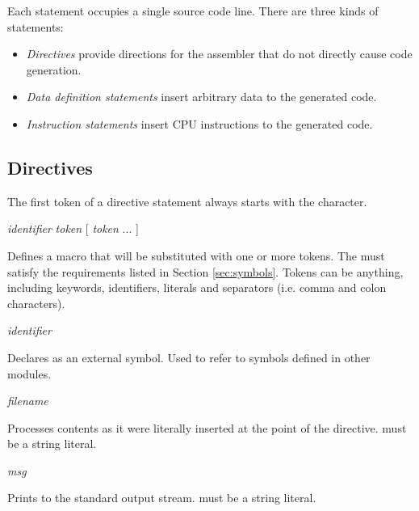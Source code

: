 \documentclass[a4paper,12pt,twoside,extrafontsizes]{memoir}
\begin{document}
Each statement occupies a single source code line. There are three kinds of statements:

\begin{itemize}
	\item \emph{Directives} provide directions for the assembler that do not directly cause code generation.
	\item \emph{Data definition statements} insert arbitrary data to the generated code.
	\item \emph{Instruction statements} insert \lxp{} CPU instructions to the generated code.
\end{itemize}

\subsection{Directives}

The first token of a directive statement always starts with the \code{\#} character.

\begin{codepar}
 \emph{identifier} \emph{token} [ \emph{token} ... ]
\end{codepar}

Defines a macro that will be substituted with one or more tokens. The  must satisfy the requirements listed in Section \ref{sec:symbols}. Tokens can be anything, including keywords, identifiers, literals and separators (i.e. comma and colon characters).

\begin{codepar}
 \emph{identifier}
\end{codepar}

Declares  as an external symbol. Used to refer to symbols defined in other modules.

\begin{codepar}
 \emph{filename}
\end{codepar}

Processes  contents as it were literally inserted at the point of the  directive.  must be a string literal.

\begin{codepar}
 \emph{msg}
\end{codepar}

Prints  to the standard output stream.  must be a string literal.
\end{document}
